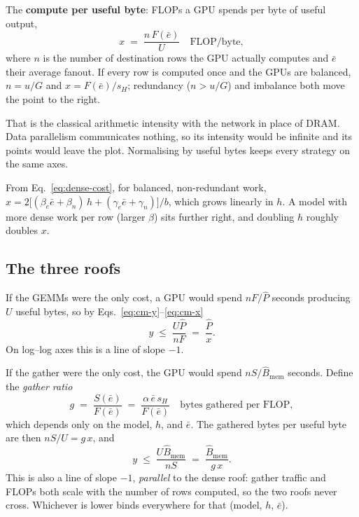 The \textbf{compute per useful byte}: FLOPs a GPU spends per byte of useful output,
\begin{equation}
  x \;=\; \frac{n\, F(\bar{e})}{U} \quad \text{FLOP/byte},
  \label{eq:cm-x}
\end{equation}
where $n$ is the number of destination rows the GPU actually computes and $\bar{e}$ their average
fanout. If every row is computed once and the GPUs are balanced, $n = u/G$ and
$x = F(\bar{e})/s_H$; redundancy ($n > u/G$) and imbalance both move the point to the right.

That is the classical arithmetic intensity with the network in place of DRAM. Data parallelism
communicates nothing, so its intensity would be infinite and its points would leave the plot.
Normalising by useful bytes keeps every strategy on the same axes.

From Eq.~\eqref{eq:dense-cost}, for balanced, non-redundant work,
$x = 2\big[(\beta_e\bar{e}+\beta_n)\,h + (\gamma_e\bar{e}+\gamma_n)\big]/b$, which grows linearly in
$h$. A model with more dense work per row (larger $\beta$) sits further right, and doubling $h$
roughly doubles $x$.

\subsection{The three roofs}
\label{sec:cm-roofs}

If the GEMMs were the only cost, a GPU would spend $nF/\hat{P}$ seconds producing $U$ useful bytes,
so by Eqs.~\eqref{eq:cm-y}--\eqref{eq:cm-x}
\begin{equation}
  y \;\le\; \frac{U\hat{P}}{nF} \;=\; \frac{\hat{P}}{x}.
  \label{eq:roof-dense}
\end{equation}
On log--log axes this is a line of slope $-1$.

If the gather were the only cost, the GPU would spend $nS/\hat{B}_{\mathrm{mem}}$ seconds. Define
the \emph{gather ratio}
\begin{equation}
  g \;=\; \frac{S(\bar{e})}{F(\bar{e})} \;=\; \frac{\alpha\,\bar{e}\,s_H}{F(\bar{e})}
  \quad\text{bytes gathered per FLOP},
  \label{eq:gather-ratio}
\end{equation}
which depends only on the model, $h$, and $\bar{e}$. The gathered bytes per useful byte are then
$nS/U = g\,x$, and
\begin{equation}
  y \;\le\; \frac{U\hat{B}_{\mathrm{mem}}}{nS} \;=\; \frac{\hat{B}_{\mathrm{mem}}}{g\,x}.
  \label{eq:roof-gather}
\end{equation}
This is also a line of slope $-1$, \emph{parallel} to the dense roof: gather traffic and FLOPs
both scale with the number of rows computed, so the two roofs never cross. Whichever is lower
binds everywhere for that (model, $h$, $\bar{e}$).

